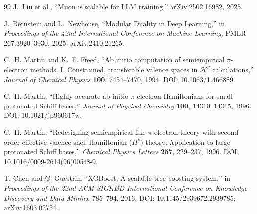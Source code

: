 \documentclass[10pt,twocolumn]{article}
\begin{document}
\begin{thebibliography}{99}
J.~Liu et al., ``Muon is scalable for LLM training,'' arXiv:2502.16982, 2025.

J.~Bernstein and L.~Newhouse, ``Modular Duality in Deep Learning,'' in \emph{Proceedings of the 42nd International Conference on Machine Learning}, PMLR 267:3920--3930, 2025; arXiv:2410.21265.

C.~H. Martin and K.~F. Freed,
``Ab initio computation of semiempirical $\pi$-electron methods. I.
Constrained, transferable valence spaces in $\mathcal H^\nu$ calculations,''
\emph{Journal of Chemical Physics} \textbf{100}, 7454--7470, 1994.
DOI: 10.1063/1.466889.

C.~H. Martin,
``Highly accurate ab initio $\pi$-electron Hamiltonians for small protonated Schiff bases,''
\emph{Journal of Physical Chemistry} \textbf{100}, 14310--14315, 1996.
DOI: 10.1021/jp960617w.

C.~H. Martin,
``Redesigning semiempirical-like $\pi$-electron theory with second order effective valence shell Hamiltonian ($H^\nu$) theory: Application to large protonated Schiff bases,''
\emph{Chemical Physics Letters} \textbf{257}, 229--237, 1996.
DOI: 10.1016/0009-2614(96)00548-9.

T. Chen and C. Guestrin,
``XGBoost: A scalable tree boosting system,''
in \emph{Proceedings of the 22nd ACM SIGKDD International Conference on Knowledge Discovery and Data Mining},
785--794, 2016. DOI: 10.1145/2939672.2939785; arXiv:1603.02754.
\end{thebibliography}
\end{document}
